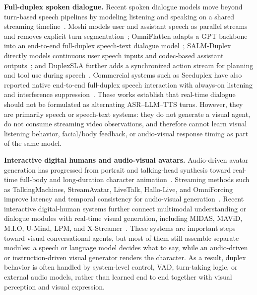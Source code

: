 \documentclass[]{style/style}
\begin{document}
\textbf{Full-duplex spoken dialogue.}
Recent spoken dialogue models move beyond turn-based speech pipelines by modeling listening and speaking on a shared streaming timeline~\citep{chen2025fullduplexsurvey}. Moshi models user and assistant speech as parallel streams and removes explicit turn segmentation~\citep{defossez2024moshi}; OmniFlatten adapts a GPT backbone into an end-to-end full-duplex speech-text dialogue model~\citep{zhang2024omniflatten}; SALM-Duplex directly models continuous user speech inputs and codec-based assistant outputs~\citep{hu2025salmduplex}; and DuplexSLA further adds a synchronized action stream for planning and tool use during speech~\citep{zhang2026duplexsla}. Commercial systems such as Seeduplex have also reported native end-to-end full-duplex speech interaction with always-on listening and interference suppression~\citep{seeduplex2026}. These works establish that real-time dialogue should not be formulated as alternating ASR--LLM--TTS turns. However, they are primarily speech or speech-text systems: they do not generate a visual agent, do not consume streaming video observations, and therefore cannot learn visual listening behavior, facial/body feedback, or audio-visual response timing as part of the same model.

\textbf{Interactive digital humans and audio-visual avatars.}
Audio-driven avatar generation has progressed from portrait and talking-head synthesis toward real-time full-body and long-duration character animation~\citep{xu2024vasa,lin2025omnihuman1,ding2025kling-avatar}. Streaming methods such as TalkingMachines, StreamAvatar, LiveTalk, Hallo-Live, and OmniForcing improve latency and temporal consistency for audio-visual generation~\citep{talkingmachines2025,streamavatar2025,livetalk2025,hallolive2026,omniforcing2026}. Recent interactive digital-human systems further connect multimodal understanding or dialogue modules with real-time visual generation, including MIDAS, MAViD, M.I.O, U-Mind, LPM, and X-Streamer~\citep{chen2025midas,mavid2025,mio2025,deng2026umind,lpm2026,xstreamer2025}. These systems are important steps toward visual conversational agents, but most of them still assemble separate modules: a speech or language model decides what to say, while an audio-driven or instruction-driven visual generator renders the character. As a result, duplex behavior is often handled by system-level control, VAD, turn-taking logic, or external audio models, rather than learned end to end together with visual perception and visual expression.
\end{document}
